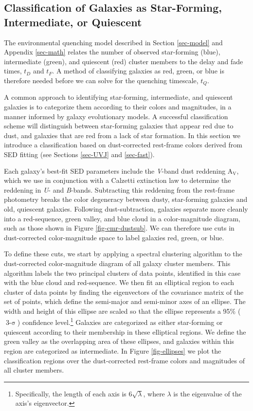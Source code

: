 \subsection{Classification of Galaxies as Star-Forming, Intermediate, or Quiescent}\label{sec-ellipses}

The environmental quenching model described in Section \ref{sec-model} and Appendix \ref{sec-math} relates the number of observed star-forming (blue), intermediate (green), and quiescent (red) cluster members to the delay and fade times, $t_D$ and $t_F$.
A method of classifying galaxies as red, green, or blue is therefore needed before we can solve for the quenching timescale, $t_Q$.

A common approach to identifying star-forming, intermediate, and quiescent galaxies is to categorize them according to their colors and magnitudes, in a manner informed by galaxy evolutionary models.
A successful classification scheme will distinguish between star-forming galaxies that appear red due to dust, and galaxies that are red from a lack of star formation.
In this section we introduce a classification based on dust-corrected rest-frame colors derived from SED fitting (see Sections \ref{sec-UVJ} and \ref{sec-fast}).

Each galaxy's best-fit SED parameters include the \textit{V}-band dust reddening $\mathrm{A_V}$, which we use in conjunction with a Calzetti extinction law \citep{Calzetti:2001hh} to determine the reddening in \textit{U}- and \textit{B}-bands.
Subtracting this reddening from the rest-frame photometry breaks the color degeneracy between dusty, star-forming galaxies and old, quiescent galaxies.
Following dust-subtraction, galaxies separate more cleanly into a red-sequence, green valley, and blue cloud in a color-magnitude diagram, such as those shown in Figure \ref{fig-cmr-dustsub}.
We can therefore use cuts in dust-corrected color-magnitude space to label galaxies red, green, or blue.

To define these cuts, we start by applying a spectral clustering algorithm to the dust-corrected color-magnitude diagram of all galaxy cluster members.
This algorithm labels the two principal clusters of data points, identified in this case with the blue cloud and red-sequence.
We then fit an elliptical region to each cluster of data points by finding the eigenvectors of the covariance matrix of the set of points, which define the semi-major and semi-minor axes of an ellipse.
The width and height of this ellipse are scaled so that the ellipse represents a 95\% ($\operatorname{3-\sigma}$) confidence level.\footnote{Specifically, the length of each axis is $6\sqrt{\lambda}$, where $\lambda$ is the eigenvalue of the axis's eigenvector.}
Galaxies are categorized as either star-forming or quiescent according to their membership in these elliptical regions.
We define the green valley as the overlapping area of these ellipses, and galaxies within this region are categorized as intermediate.
In Figure \ref{fig-ellipses} we plot the classification regions over the dust-corrected rest-frame colors and magnitudes of all cluster members.

